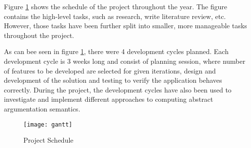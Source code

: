 Figure \ref{fig:projectSchedule} shows the schedule of the project throughout the year. The figure contains the high-level tasks, such as research, write literature review, etc. However, those tasks have been further split into smaller, more manageable tasks throughout the project.  


As can bee seen in figure \ref{fig:projectSchedule}, there were 4 development cycles planned. Each development cycle is 3 weeks long and consist of planning session, where number of features to be developed are selected for given iterations, design and development of the solution and testing to verify the application behaves correctly. During the project, the development cycles have also been used to investigate and implement different approaches to computing abstract argumentation semantics.
\begin{landscape}
	\centering
	\begin{figure}[]
		\texttt{[image: gantt]}
		\caption{Project Schedule}
		\label{fig:projectSchedule}
	\end{figure}
\end{landscape}